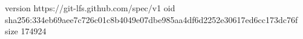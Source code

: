 version https://git-lfs.github.com/spec/v1
oid sha256:334eb69aee7c726c01c8b4049e07dbe985aa4df6d2252e30617ed6cc173dc76f
size 174924
